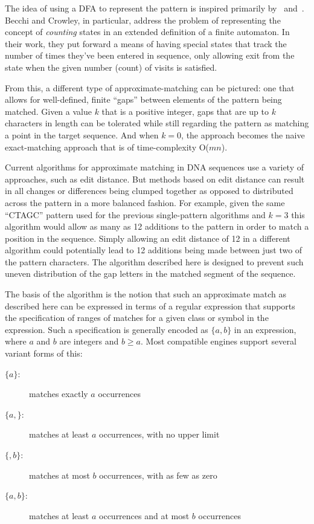 The idea of using a DFA to represent the pattern is inspired primarily by~\cite{aho} and~\cite{becchi}. Becchi and Crowley, in particular, address the problem of representing the concept of \textit{counting} states in an extended definition of a finite automaton. In their work, they put forward a means of having special states that track the number of times they've been entered in sequence, only allowing exit from the state when the given number (count) of visits is satisfied.

From this, a different type of approximate-matching can be pictured: one that allows for well-defined, finite ``gaps'' between elements of the pattern being matched. Given a value $k$ that is a positive integer, gaps that are up to $k$ characters in length can be tolerated while still regarding the pattern as matching a point in the target sequence. And when $k = 0$, the approach becomes the naive exact-matching approach that is of time-complexity O($mn$).

Current algorithms for approximate matching in DNA sequences use a variety of approaches, such as edit distance. But methods based on edit distance can result in all changes or differences being clumped together as opposed to distributed across the pattern in a more balanced fashion. For example, given the same ``CTAGC'' pattern used for the previous single-pattern algorithms and $k = 3$ this algorithm would allow as many as 12 additions to the pattern in order to match a position in the sequence. Simply allowing an edit distance of 12 in a different algorithm could potentially lead to 12 additions being made between just two of the pattern characters. The algorithm described here is designed to prevent such uneven distribution of the gap letters in the matched segment of the sequence.

The basis of the algorithm is the notion that such an approximate match as described here can be expressed in terms of a regular expression that supports the specification of ranges of matches for a given class or symbol in the expression. Such a specification is generally encoded as \texttt{$\lbrace a,b \rbrace$} in an expression, where $a$ and $b$ are integers and $b \geq a$. Most compatible engines support several variant forms of this:

\begin{description}
\item[\texttt{$\lbrace a \rbrace$}:] matches exactly $a$ occurrences
\item[\texttt{$\lbrace a, \rbrace$}:] matches at least $a$ occurrences, with no upper limit
\item[\texttt{$\lbrace ,b \rbrace$}:] matches at most $b$ occurrences, with as few as zero
\item[\texttt{$\lbrace a,b \rbrace$}:] matches at least $a$ occurrences and at most $b$ occurrences
\end{description}

